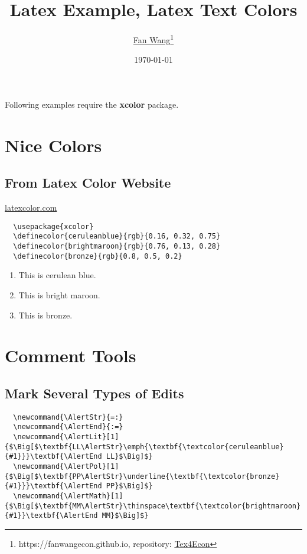 \documentclass[12pt,english]{article}
\title{Latex Example, Latex Text Colors}
\author{\href{https://fanwangecon.github.io/}{Fan Wang}\thanks{https://fanwangecon.github.io, repository: \href{https://fanwangecon.github.io/Tex4Econ/}{Tex4Econ}}}
\date{\today}
\begin{document}
\maketitle

Following examples require the \textbf{xcolor} package.

\section{Nice Colors}
\subsection{From Latex Color Website}
\href{http://latexcolor.com/}{latexcolor.com}
\begin{lstlisting}
  \usepackage{xcolor}
  \definecolor{ceruleanblue}{rgb}{0.16, 0.32, 0.75}
  \definecolor{brightmaroon}{rgb}{0.76, 0.13, 0.28}
  \definecolor{bronze}{rgb}{0.8, 0.5, 0.2}
\end{lstlisting}

\begin{enumerate}
  \item \textcolor{ceruleanblue}{This is cerulean blue.}
  \item \textcolor{brightmaroon}{This is bright maroon.}
  \item \textcolor{bronze}{This is bronze.}
\end{enumerate}

\section{Comment Tools}
\subsection{Mark Several Types of Edits}
\begin{lstlisting}
  \newcommand{\AlertStr}{=:}
  \newcommand{\AlertEnd}{:=}
  \newcommand{\AlertLit}[1]{$\Big[$\textbf{LL\AlertStr}\emph{\textbf{\textcolor{ceruleanblue}{#1}}}\textbf{\AlertEnd LL}$\Big]$}
  \newcommand{\AlertPol}[1]{$\Big[$\textbf{PP\AlertStr}\underline{\textbf{\textcolor{bronze}{#1}}}\textbf{\AlertEnd PP}$\Big]$}
  \newcommand{\AlertMath}[1]{$\Big[$\textbf{MM\AlertStr}\thinspace\textbf{\textcolor{brightmaroon}{#1}}\textbf{\AlertEnd MM}$\Big]$}
\end{lstlisting}
\end{document}
